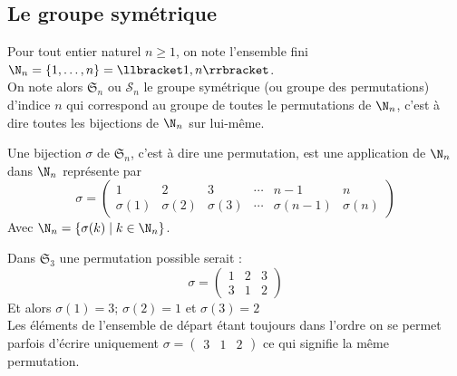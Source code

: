 \subsection{Le groupe symétrique}
\begin{defini}
Pour tout entier naturel $n\geq 1$, on note l'ensemble fini $\N_n=\{1,\dots,n\}=\llbracket 1,n \rrbracket$.\\ On note alors $\mathfrak{S}_n$ ou $\mathcal{S}_n$ le groupe symétrique (ou groupe des permutations) d'indice $n$ qui correspond au groupe de toutes le permutations de $\N_n$, c'est à dire toutes les bijections de $\N_n$ sur lui-même.
\end{defini}

Une bijection $\sigma$ de $\mathfrak{S}_n$, c'est à dire une permutation, est une application de $\N_n$ dans $\N_n$ représente par
$$\sigma = \begin{pmatrix}
    1 & 2 & 3 & \cdots & n-1 & n \\
    \sigma(1) & \sigma(2) & \sigma(3) & \cdots &  \sigma(n-1)  & \sigma(n)
\end{pmatrix}$$
Avec $\N_n=\{\sigma(k)\mid k\in \N_n\}$.

\begin{ex}Dans $\mathfrak{S}_3$ une permutation possible serait :	
\[
\sigma = 
\begin{pmatrix}
    1 & 2 & 3 \\
    3 & 1 & 2
\end{pmatrix}
\]
Et alors $\sigma(1)=3$; $\sigma(2)=1$ et $\sigma(3)=2$\\
Les éléments de l'ensemble de départ étant toujours dans l'ordre on se permet parfois d'écrire uniquement $\sigma=	\begin{pmatrix}
    3 & 1 & 2
\end{pmatrix}$ ce qui signifie la même permutation.
\end{ex}


